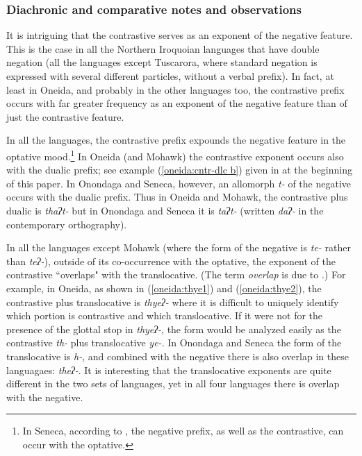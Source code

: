 \documentclass[output=paper,colorlinks,citecolor=brown]{langscibook}
\begin{document}
\subsubsection{Diachronic and comparative notes and observations}
\label{oneida:sec:diachronic}

It is intriguing that the contrastive serves as an exponent of the negative feature. This is the case in all the Northern Iroquoian languages that have double negation (all the languages except Tuscarora, where standard negation is expressed with several different particles, without a verbal prefix). In fact, at least in Oneida, and probably in the other languages too, the contrastive prefix occurs with far greater frequency as an exponent of the negative feature than of just the contrastive feature. 

In all the languages, the contrastive prefix expounds the negative feature in the optative mood.\footnote{In Seneca, according to \citet[54]{Chafe2015}, the negative prefix, as well as the contrastive, can occur with the optative.} In Oneida (and Mohawk) the contrastive exponent occurs also with the dualic prefix; see example (\ref{oneida:cntr-dlc b}) given in  at the beginning of this paper. In Onondaga and Seneca, however, an allomorph \textit{t-} of the negative occurs with the dualic prefix. Thus in Oneida and Mohawk, the contrastive plus dualic is \textit{thaʔt-} but in Onondaga and Seneca it is \textit{taʔt-} (written \textit{daʔ-} in the contemporary orthography).

In all the languages except Mohawk (where the form of the negative is \textit{te-} rather than \textit{teʔ-}), outside of its co-occurrence with the optative, the exponent of the contrastive ``overlaps" with the translocative. (The term \textit{overlap} is due to \citealt[53]{Chafe2015}.) For example, in Oneida, as shown in (\ref{oneida:thye1}) and (\ref{oneida:thye2}), the contrastive plus translocative is \textit{thyeʔ-} where it is difficult to uniquely identify which portion is contrastive and which translocative. If it were not for the presence of the glottal stop in \textit{thyeʔ-}, the form would be analyzed easily as the contrastive \textit{th-} plus translocative \textit{ye-}. In Onondaga \citep[186--187]{Woodbury2018} and Seneca \citep[53]{Chafe2015} the form of the translocative is \textit{h-}, and combined with the negative there is also overlap in these languagaes: \textit{theʔ-}. It is interesting that  the translocative exponents are quite different in the two sets of languages, yet in all four languages there is overlap with the negative.
\end{document}
